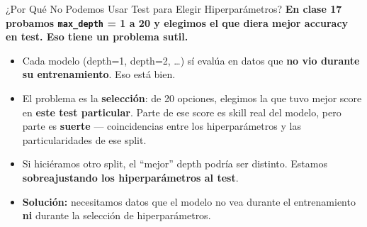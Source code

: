 \documentclass[aspectratio=169, 11pt]{beamer}
\begin{document}
\begin{frame}{¿Por Qué No Podemos Usar Test para Elegir Hiperparámetros?}
  \vspace{-4pt}
  {\footnotesize\color{arcaDark}\bfseries
    En clase 17 probamos \texttt{max\_depth} = 1 a 20 y elegimos el que
    diera mejor accuracy en \textbf{test}. Eso tiene un problema sutil.}

  \vspace{6pt}
  {\footnotesize
  \begin{itemize}\setlength{\itemsep}{5pt}
    \item[{\color{arcaRed}\scriptsize\faArrowRight}]
      Cada modelo (depth=1, depth=2, \ldots) sí evalúa en datos que
      \textbf{no vio durante su entrenamiento}. Eso está bien.
    \item[{\color{arcaRed}\scriptsize\faArrowRight}]
      El problema es la \textbf{selección}: de 20 opciones, elegimos la que
      tuvo mejor score en \textbf{este test particular}. Parte de ese score
      es skill real del modelo, pero parte es \textbf{suerte} --- coincidencias
      entre los hiperparámetros y las particularidades de ese split.
    \item[{\color{arcaRed}\scriptsize\faArrowRight}]
      Si hiciéramos otro split, el ``mejor'' depth podría ser distinto.
      Estamos \textbf{sobreajustando los hiperparámetros al test}.
    \item[{\color{codeGreen}\scriptsize\faArrowRight}]
      \textbf{Solución:} necesitamos datos que el modelo no vea durante
      el entrenamiento \textbf{ni} durante la selección de hiperparámetros.
  \end{itemize}
  }
\end{frame}
\end{document}

